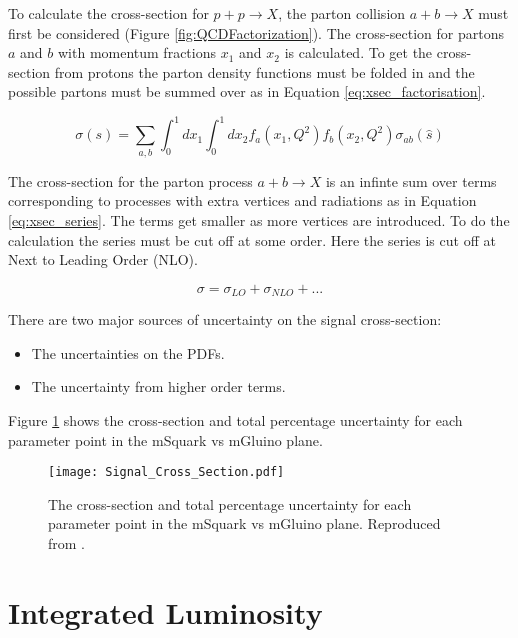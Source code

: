 To calculate the cross-section for $p + p \rightarrow X$, the parton collision 
$a + b \rightarrow X$ must first be considered (Figure 
\ref{fig:QCDFactorization}). The cross-section for partons $a$ and $b$ with 
momentum fractions $x_{1}$ and $x_{2}$ is calculated. To get the cross-section 
from protons the parton density functions must be folded in and the possible 
partons must be summed over as in Equation \ref{eq:xsec_factorisation}.

\begin{equation}
\sigma(s) =
\displaystyle\sum\limits_{a,b}\int_{0}^{1}dx_{1}\int_{0}^{1}dx_{2}f_{a}(x_{1},Q^{2})f_{b}(x_{2},Q^{2})\sigma_{ab}(\hat{s})
\label{eq:xsec_factorisation}
\end{equation}

The cross-section for the parton process $a + b \rightarrow X$ is an infinte sum
over terms corresponding to processes with extra vertices and radiations as in
Equation \ref{eq:xsec_series}. The terms get smaller as more vertices are 
introduced. To do the calculation the series must be cut off at some order. Here
the series is cut off at Next to Leading Order (NLO).

\begin{equation}
\sigma = \sigma_{LO} + \sigma_{NLO} + ...
\label{eq:xsec_series}
\end{equation}

There are two major sources of uncertainty on the signal cross-section:

\begin{itemize} 
\item The uncertainties on the PDFs.
\item The uncertainty from higher order terms.
\end{itemize}

Figure \ref{fig:xsec_unc} shows the cross-section and total percentage 
uncertainty for each parameter point in the mSquark vs mGluino plane.

\begin{figure}
\begin{center}
\texttt{[image: Signal\_Cross\_Section.pdf]}
\end{center}
\caption{The cross-section and total percentage uncertainty for each parameter 
point in the mSquark vs mGluino plane. Reproduced from \cite{ra3}.}
\label{fig:xsec_unc}
\end{figure}

\section{Integrated Luminosity}

